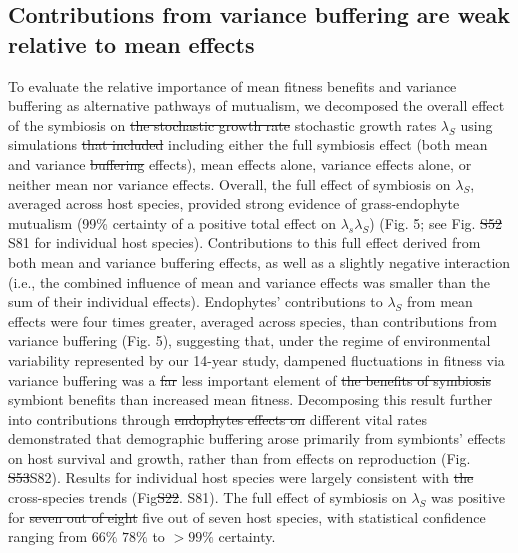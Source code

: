 \documentclass[lineno, sn-basic]{sn-jnl}%
\providecommand{\DIFadd}[1]{{\protect\color{blue}#1}} %
\providecommand{\DIFdel}[1]{{\protect\color{red}\protect\scriptsize\sout{#1}}}
\providecommand{\DIFadd}[1]{{\protect\color{blue}\uwave{#1}}} %
\providecommand{\DIFdel}[1]{{\protect\color{red}\sout{#1}}}                      %
\providecommand{\DIFaddbegin}{} %
\providecommand{\DIFaddend}{} %
\providecommand{\DIFdelbegin}{} %
\providecommand{\DIFdelend}{} %
\newcommand{\DIFscaledelfig}{0.5}
\newlength{\DIFdelgraphicswidth} %
\newlength{\DIFdelgraphicsheight} %
\newcommand{\DIFaddincludegraphics}[2][]{{\color{blue}\fbox{\DIFOincludegraphics[#1]{#2}}}} %
\newcommand{\DIFdelincludegraphics}[2][]{%
\sbox{\DIFdelgraphicsbox}{\DIFOincludegraphics[#1]{#2}}%
\settoboxwidth{\DIFdelgraphicswidth}{\DIFdelgraphicsbox} %
\settoboxtotalheight{\DIFdelgraphicsheight}{\DIFdelgraphicsbox} %
\scalebox{\DIFscaledelfig}{%
\parbox[b]{\DIFdelgraphicswidth}{\usebox{\DIFdelgraphicsbox}\\[-\baselineskip] \rule{\DIFdelgraphicswidth}{0em}}\llap{\resizebox{\DIFdelgraphicswidth}{\DIFdelgraphicsheight}{%
\setlength{\unitlength}{\DIFdelgraphicswidth}%
\begin{picture}(1,1)%
\thicklines\linethickness{2pt} %
{\color[rgb]{1,0,0}\put(0,0){\framebox(1,1){}}}%
{\color[rgb]{1,0,0}\put(0,0){\line( 1,1){1}}}%
{\color[rgb]{1,0,0}\put(0,1){\line(1,-1){1}}}%
\end{picture}%
}\hspace*{3pt}}} %
} %
\DeclareRobustCommand{\DIFaddbegin}{\DIFOaddbegin \let\includegraphics\DIFaddincludegraphics} %
\DeclareRobustCommand{\DIFaddend}{\DIFOaddend \let\includegraphics\DIFOincludegraphics} %
\DeclareRobustCommand{\DIFdelbegin}{\DIFOdelbegin \let\includegraphics\DIFdelincludegraphics} %
\DeclareRobustCommand{\DIFdelend}{\DIFOaddend \let\includegraphics\DIFOincludegraphics} %
\begin{document}
\subsection*{Contributions from variance buffering are weak relative to mean effects}
To evaluate the relative importance of mean fitness benefits and variance buffering as alternative pathways of mutualism, we decomposed  the overall effect of the symbiosis on \DIFdelbegin \DIFdel{the stochastic growth rate }\DIFdelend \DIFaddbegin \DIFadd{stochastic growth rates }\DIFaddend $\lambda_{S}$ using simulations \DIFdelbegin \DIFdel{that included }\DIFdelend \DIFaddbegin \DIFadd{including }\DIFaddend either the full symbiosis effect (both mean and variance \DIFdelbegin \DIFdel{buffering }\DIFdelend effects), mean effects alone, variance effects alone, or neither mean nor variance effects. 
Overall, the full effect of symbiosis on $\lambda_{S}$, averaged across host species, provided strong evidence of grass-endophyte mutualism (99\% certainty of a positive total effect on \DIFdelbegin \DIFdel{$\lambda_s$}\DIFdelend \DIFaddbegin \DIFadd{$\lambda_S$}\DIFaddend ) (Fig. 5; see Fig. \DIFdelbegin \DIFdel{S52 }\DIFdelend \DIFaddbegin \DIFadd{S81 }\DIFaddend for individual host species).
Contributions to this full effect derived from both mean and variance buffering effects, as well as a slightly negative interaction (i.e., the combined influence of mean and variance effects was smaller than the sum of their individual effects). 
Endophytes' contributions to  $\lambda_{S}$ from mean effects were four times greater, averaged across species, than contributions from variance buffering (Fig. 5), suggesting that, under the regime of environmental variability represented by our 14-year study, dampened fluctuations in fitness via variance buffering was a \DIFdelbegin \DIFdel{far }\DIFdelend less important element of \DIFdelbegin \DIFdel{the benefits of symbiosis }\DIFdelend \DIFaddbegin \DIFadd{symbiont benefits }\DIFaddend than increased mean fitness. 
Decomposing this result further into contributions through \DIFdelbegin \DIFdel{endophytes effects on }\DIFdelend different vital rates demonstrated that demographic buffering arose primarily from symbionts' effects on host survival and growth, rather than from effects on reproduction (Fig. \DIFdelbegin \DIFdel{S53}\DIFdelend \DIFaddbegin \DIFadd{S82}\DIFaddend ).
Results for individual host species were largely consistent with \DIFdelbegin \DIFdel{the }\DIFdelend cross-species trends (Fig\DIFdelbegin \DIFdel{S22}\DIFdelend \DIFaddbegin \DIFadd{. S81}\DIFaddend ). 
The full effect of symbiosis on $\lambda_{S}$ was positive for \DIFdelbegin \DIFdel{seven out of eight }\DIFdelend \DIFaddbegin \DIFadd{five out of seven }\DIFaddend host species, with statistical confidence ranging from \DIFdelbegin \DIFdel{$66\%$ }\DIFdelend \DIFaddbegin \DIFadd{$78\%$ }\DIFaddend to $>99\%$ certainty.
\end{document}
